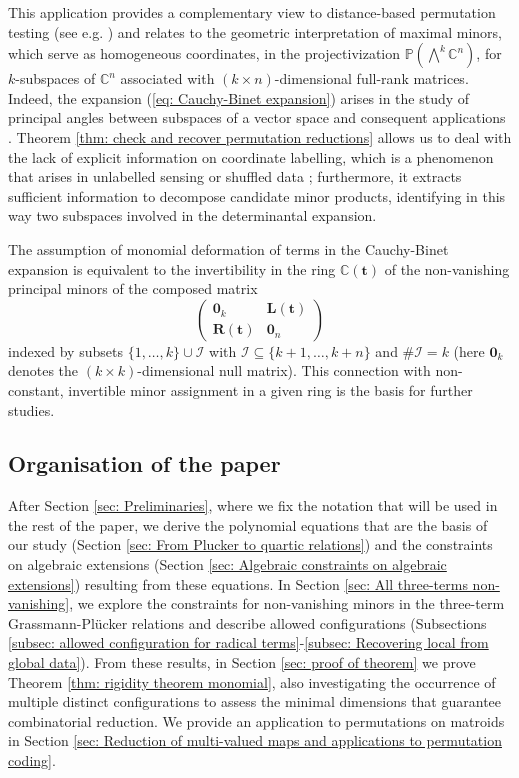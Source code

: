 \documentclass[10pt]{article}
\theoremstyle{remark}%
\theoremstyle{definition}%
\begin{document}
This application provides a complementary view to distance-based permutation testing (see e.g. \cite{Fox2018}) and relates to the geometric interpretation of maximal minors, which serve as homogeneous coordinates, in the projectivization $\mathbb{P}(\bigwedge^{k}\mathbb{C}^{n})$, for $k$-subspaces of $\mathbb{C}^{n}$ associated with $(k\times n)$-dimensional full-rank matrices. Indeed, the expansion (\ref{eq: Cauchy-Binet expansion}) arises in the study of principal angles between subspaces of a vector space \citep{Miao1992} and consequent applications \citep{Hamm2008,Dong2022}. Theorem \ref{thm: check and recover permutation reductions} allows us to deal with the lack of explicit information on coordinate labelling, which is a phenomenon that arises in unlabelled sensing or shuffled data \cite{Tsakiris2020,Peng2021}; furthermore, it extracts sufficient information to decompose candidate minor products, identifying in this way two subspaces involved in the determinantal expansion. 

The assumption of monomial deformation of terms in the Cauchy-Binet expansion is equivalent to the invertibility in the ring $\mathbb{C}(\mathbf{t})$ of the non-vanishing principal minors of the composed matrix 
\begin{equation*}
\begin{pmatrix}\mathbf{0}_{k} & \mathbf{L}(\mathbf{t})\\
\mathbf{R}(\mathbf{t}) & \mathbf{0}_{n}
\end{pmatrix}
\end{equation*}
indexed by subsets $\{1,\dots,k\}\cup\mathcal{I}$ with $\mathcal{I}\subseteq\{k+1,\dots,k+n\}$ and $\#\mathcal{I}=k$ (here $\mathbf{0}_{k}$ denotes the $(k\times k)$-dimensional null matrix). This connection with non-constant, invertible minor assignment in a given ring is the basis for further studies.

\subsection{Organisation of the paper}
\label{subsec: organization of the paper}

After Section \ref{sec: Preliminaries}, where we fix the notation that will be used in the rest of the paper, we derive the polynomial equations that are the basis of our study (Section \ref{sec: From Plucker to quartic relations}) and the constraints on algebraic extensions (Section \ref{sec: Algebraic constraints on algebraic extensions}) resulting from these equations. In Section \ref{sec: All three-terms non-vanishing}, we explore the constraints for non-vanishing minors in the three-term Grassmann-Pl\"{u}cker relations and describe allowed configurations (Subsections \ref{subsec: allowed configuration for radical terms}-\ref{subsec: Recovering local from global data}). From these results, in Section \ref{sec: proof of theorem} we prove Theorem \ref{thm: rigidity theorem monomial}, also investigating the occurrence of multiple distinct configurations to assess the minimal dimensions that guarantee com\-bi\-na\-to\-rial reduction. We provide an application to permutations on matroids in Section \ref{sec: Reduction of multi-valued maps and applications to permutation coding}.
\end{document}

